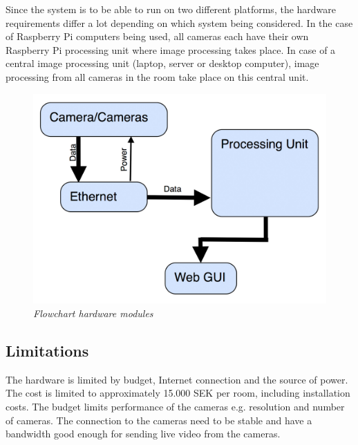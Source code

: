 
Since the system is to be able to run on two different platforms, the hardware requirements differ a lot depending on which system being considered. In the case of Raspberry Pi computers being used, all cameras each have their own Raspberry Pi processing unit where image processing takes place. In case of a central image processing unit (laptop, server or desktop computer), image processing from all cameras in the room take place on this central unit.


\begin{figure}[htb]
	\centering
	\includegraphics[width=160mm]{images/Hardware-flowchart.jpg}
	\caption[This text ends up at the list of figures]{\textit{Flowchart hardware modules}}
	\label{fig:block_overview_fig}  %
\end{figure}


\subsection{Limitations}
The hardware is limited by budget, Internet connection and the source of power. The cost is limited to approximately 15.000 SEK per room, including installation costs. The budget limits performance of the cameras e.g. resolution and number of cameras. The connection to the cameras need to be stable and have a bandwidth good enough for sending live video from the cameras.   
\newpage
